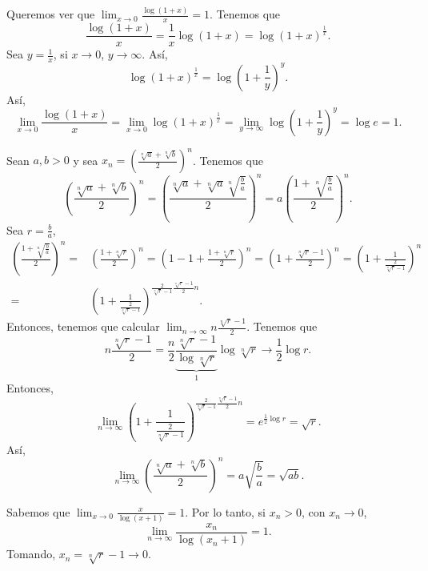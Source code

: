 \begin{observation}
\normalfont Queremos ver que $\displaystyle \lim_{x \to 0}\frac{\log\left(1+x\right)}{x} = 1 $. Tenemos que
\[\frac{\log\left(1+x\right)}{x} = \frac{1}{x}\log\left(1+x\right) = \log\left(1+x\right)^{\frac{1}{x}} .\]
Sea $\displaystyle y = \frac{1}{x} $, si $\displaystyle x \to 0 $, $\displaystyle y \to \infty $. Así, 
\[\log\left(1+x\right)^{\frac{1}{x}} = \log\left(1 + \frac{1}{y}\right)^{y} .\]
Así, 
\[\lim_{x \to 0}\frac{\log\left(1+x\right)}{x} = \lim_{x \to 0}\log\left(1+x\right)^{\frac{1}{x}} = \lim_{y \to \infty}\log\left(1+\frac{1}{y}\right)^{y} = \log e = 1 .\]
\end{observation}

\begin{eg}
	\normalfont Sean $\displaystyle a,b > 0 $ y sea $\displaystyle x_{n} = \left(\frac{\sqrt[n]{a} + \sqrt[n]{b}}{2}\right)^{n} $. Tenemos que
	\[ \left(\frac{\sqrt[n]{a} + \sqrt[n]{b}}{2}\right)^{n} = \left(\frac{\sqrt[n]{a} + \sqrt[n]{a}\sqrt[n]{\frac{b}{a}}}{2}\right)^{n} = a \left(\frac{1 + \sqrt[n]{\frac{b}{a}}}{2}\right)^{n} .\]
Sea $\displaystyle r = \frac{b}{a} $,
\[
\begin{split}
	 \left(\frac{1 + \sqrt[n]{\frac{b}{a}}}{2}\right)^{n} = &  \left(\frac{1 + \sqrt[n]{r}}{2}\right)^{n} = \left(1-1+\frac{1+\sqrt[n]{r}}{2}\right)^{n}= \left(1 + \frac{\sqrt[n]{r}-1}{2}\right)^{n} = \left(1 + \frac{1}{\frac{2}{\sqrt[n]{r}-1}}\right)^{n} \\
	= & \left(1+\frac{1}{\frac{2}{\sqrt[n]{r}-1}}\right)^{\frac{2}{\sqrt[n]{r}-1}\frac{\sqrt[n]{r}-1}{2}n}.
\end{split}
\]
Entonces, tenemos que calcular $\displaystyle \lim_{n \to \infty}n\frac{\sqrt[n]{r}-1}{2} $. Tenemos que
\[ n \frac{\sqrt[n]{r}-1}{2} = \frac{n}{2}\underbrace{\frac{\sqrt[n]{r}-1}{\log\sqrt[n]{r}}}_{1}\log\sqrt[n]{r} \to \frac{1}{2}\log r.\]
Entonces, 
\[\lim_{n \to \infty}\left(1+\frac{1}{\frac{2}{\sqrt[n]{r}-1}}\right)^{\frac{2}{\sqrt[n]{r}-1}\frac{\sqrt[n]{r}-1}{2}n}=e^{\frac{1}{2}\log r} = \sqrt{r} .\]
Así, 
\[\lim_{n \to \infty}\left(\frac{\sqrt[n]{a} + \sqrt[n]{b}}{2}\right)^{n} = a \sqrt{\frac{b}{a}} = \sqrt{ab} .\]
\end{eg}

\begin{observation}
\normalfont Sabemos que $\displaystyle \lim_{x \to 0}\frac{x}{\log\left(x+1\right)} = 1 $. Por lo tanto, si $\displaystyle x_{n} > 0 $, con $\displaystyle x_{n} \to 0 $, 
\[\lim_{n \to \infty}\frac{x_{n}}{\log\left(x_{n}+1\right)} = 1.\]
Tomando, $\displaystyle x_{n} = \sqrt[n]{r} - 1 \to 0 $.
\end{observation}


